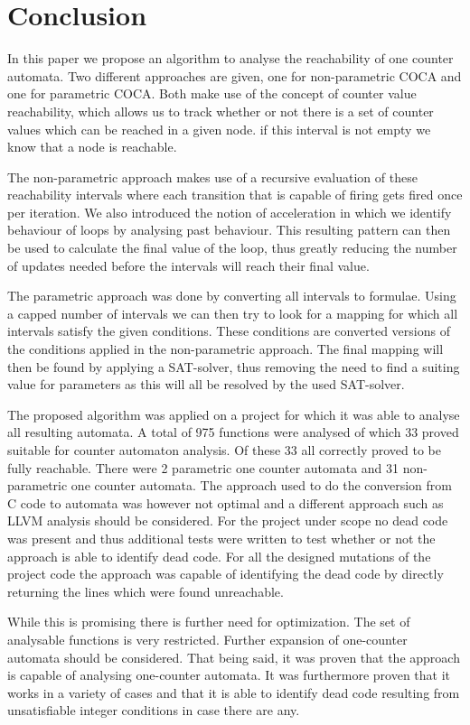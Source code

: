 \documentclass[12pt]{article}
\begin{document}
\section{Conclusion}
In this paper we propose an algorithm to analyse the reachability of one counter automata. Two different approaches are given, one for non-parametric COCA and one for parametric COCA. Both make use of the concept of counter value reachability, which allows us to track whether or not there is a set of counter values which can be reached in a given node. if this interval is not empty we know that a node is reachable.

The non-parametric approach makes use of a recursive evaluation of these reachability intervals where each transition that is capable of firing gets fired once per iteration. We also introduced the notion of acceleration in which we identify behaviour of loops by analysing past behaviour. This resulting pattern can then be used to calculate the final value of the loop, thus greatly reducing the number of updates needed before the intervals will reach their final value.

The parametric approach was done by converting all intervals to formulae. Using a capped number of intervals we can then try to look for a mapping for which all intervals satisfy the given conditions. These conditions are converted versions of the conditions applied in the non-parametric approach. The final mapping will then be found by applying a SAT-solver, thus removing the need to find a suiting value for parameters as this will all be resolved by the used SAT-solver.

The proposed algorithm was applied on a project for which it was able to analyse all resulting automata. A total of 975 functions were analysed of which 33 proved suitable for counter automaton analysis. Of these 33 all correctly proved to be fully reachable. There were 2 parametric one counter automata and 31 non-parametric one counter automata. The approach used to do the conversion from C code to automata was however not optimal and a different approach such as LLVM analysis should be considered. For the project under scope no dead code was present and thus additional tests were written to test whether or not the approach is able to identify dead code. For all the designed mutations of the project code the approach was capable of identifying the dead code by directly returning the lines which were found unreachable.

While this is promising there is further need for optimization. The set of analysable functions is very restricted. Further expansion of one-counter automata should be considered. That being said, it was proven that the approach is capable of analysing one-counter automata. It was furthermore proven that it works in a variety of cases and that it is able to identify dead code resulting from unsatisfiable integer conditions in case there are any.
\printbibliography
\end{document}
